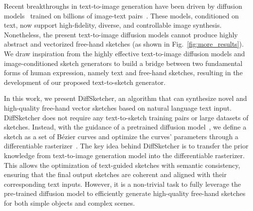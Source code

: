 \documentclass{article}
\begin{document}
Recent breakthroughs in text-to-image generation have been driven by diffusion models~\cite{GLIDE_2022_nichol,DALLE2_2022_ramesh,ldm_2022_Rombach,imagen_2022_saharia} trained on billions of image-text pairs~\cite{laion_schuhmann_2022}. These models, conditioned on text, now support high-fidelity, diverse, and controllable image synthesis. Nonetheless, the present text-to-image diffusion models cannot produce highly abstract and vectorized free-hand sketches (as shown in Fig.~\ref{fig:more_results}).
We draw inspiration from the highly effective text-to-image diffusion models and image-conditioned sketch generators to build a bridge between two fundamental forms of human expression, namely text and free-hand sketches, resulting in the development of our proposed text-to-sketch generator.

In this work, we present DiffSketcher, an algorithm that can synthesize novel and high-quality free-hand vector sketches based on natural language text input. DiffSketcher does not require any text-to-sketch training pairs or large datasets of sketches. Instead, with the guidance of a pretrained diffusion model~\cite{ldm_2022_Rombach}, we define a sketch as a set of Bézier curves and optimize the curves' parameters through a differentiable rasterizer~\cite{Li_2020_diffvg}. The key idea behind DiffSketcher is to transfer the prior knowledge from text-to-image generation model into the differentiable rasterizer. This allows the optimization of text-guided sketches with semantic consistency, ensuring that the final output sketches are coherent and aligned with their corresponding text inputs.
However, it is a non-trivial task to fully leverage the pre-trained diffusion model to efficiently generate high-quality free-hand sketches for both simple objects and complex scenes.
\end{document}
